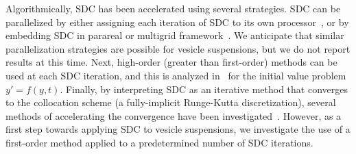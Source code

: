 Algorithmically, SDC has been accelerated using several strategies.
SDC can be parallelized by either assigning each iteration of SDC to
its own processor~\cite{chr:ong2011, chr:mac:ong2010, chr:hay:ong2012,
ong:mel:chr2012}, or by embedding SDC in parareal or multigrid
framework~\cite{emm:min2012, spe:rup:emm:bol:kra2014,
min:spe:bol:emm:rup2015, spe:rup:emm:min:bol:kra2014}.  We anticipate
that similar parallelization strategies are possible for vesicle
suspensions, but we do not report results at this time.  Next,
high-order (greater than first-order) methods can be used at each SDC
iteration, and this is analyzed in~\cite{chr:ong:qui2009} for the
initial value problem $y' = f(y,t)$.  Finally, by interpreting SDC as
an iterative method that converges to the collocation scheme (a
fully-implicit Runge-Kutta discretization), several methods of
accelerating the convergence have been
investigated~\cite{hua:jia:min2006, hua:jia:min2007, emm:min2012,
wei2013, win:spe:rup2014, bu:hua:min2009, bu:hua:min2012, jia:hua2008,
min:spe:bol:emm:rup2015, spe:rup:emm:bol:kra2014,
spe:rup:emm:min:bol:kra2014, spe:rup:min:emm:kra2014}.  However, as a
first step towards applying SDC to vesicle suspensions, we investigate
the use of a first-order method applied to a predetermined number of
SDC iterations.

